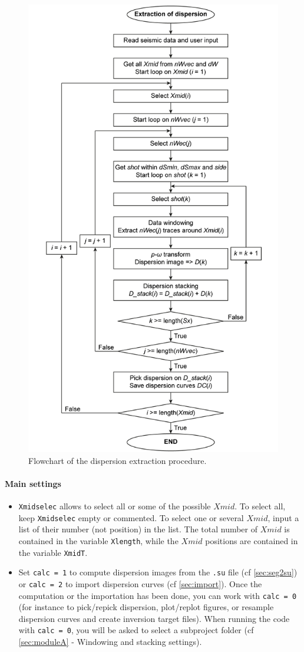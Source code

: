 \documentclass[twoside,a4paper]{article}
\begin{document}
\begin{figure}
\centerline{\includegraphics[width=0.65\linewidth]{figures/flowchart_extraction.png}}
\caption{Flowchart of the dispersion extraction procedure.}
\label{fig:flowchart_extraction}
\end{figure}

\paragraph{Main settings}
\begin{itemize}[leftmargin=*]
\setlength\itemsep{2ex}
\item \verb|Xmidselec| allows to select all or some of the possible $Xmid$. To select all, keep \verb|Xmidselec| empty or commented. To select one or several $Xmid$, input a list of their number (not position) in the list. The total number of $Xmid$ is contained in the variable \verb|Xlength|, while the $Xmid$ positions are contained in the variable \verb|XmidT|.

\item Set \verb|calc = 1| to compute dispersion images from the \verb|.su| file (cf \ref{sec:seg2su}) or \verb|calc = 2| to import dispersion curves (cf \ref{sec:import}). Once the computation or the importation has been done, you can work with \verb|calc = 0| (for instance to pick/repick dispersion, plot/replot figures, or resample dispersion curves and create inversion target files). When running the code with \verb|calc = 0|, you will be asked to select a subproject folder (cf \ref{sec:moduleA} - Windowing and stacking settings).
\end{itemize}
\end{document}
